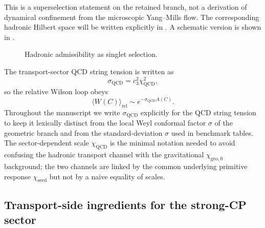 \documentclass[11pt,a4paper]{article}
\theoremstyle{definition}
\theoremstyle{remark}
\newcommand{\cthree}{c_3}
\newcommand{\QCD}{\mathrm{QCD}}
\newcommand{\chiseed}{\chi_{\mathrm{seed}}}
\newcommand{\chigeozero}{\chi_{\mathrm{geo},0}}
\newcommand{\sigmaQCD}{\sigma_{\mathrm{QCD}}}
\begin{document}
This is a superselection statement on the retained branch, not a derivation of dynamical confinement from the microscopic Yang--Mills flow. The corresponding hadronic Hilbert space will be written explicitly in . A schematic version is shown in .

\begin{figure}[t]
\centering
{}
\caption{Hadronic admissibility as singlet selection.}
\label{fig:admissible-words}
\end{figure}

The transport-sector QCD string tension is written as
\[
\sigmaQCD=\cthree^2\chi_{\QCD}^2,
\]
so the relative Wilson loop obeys
\[
\langle W(C)\rangle_{\mathrm{rel}}\sim e^{-\sigmaQCD A(C)}.
\]
Throughout the manuscript we write $\sigmaQCD$ explicitly for the QCD string tension to keep
it lexically distinct from the local Weyl conformal factor $\sigma$ of the geometric branch and
from the standard-deviation $\sigma$ used in benchmark tables. The sector-dependent scale
$\chi_{\QCD}$ is the minimal notation needed to avoid confusing the hadronic transport channel
with the gravitational $\chigeozero$ background; the two channels are linked by the common
underlying primitive response $\chiseed$ but not by a naive equality of scales.

\subsection{Transport-side ingredients for the strong-CP sector}
\end{document}
